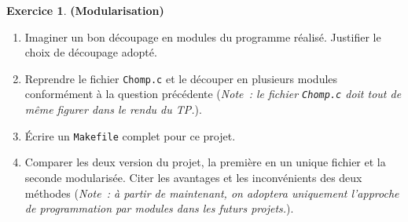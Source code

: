 \documentclass[12pt]{article}
\theoremstyle{definition}
\newtheorem{Exercice}{Exercice}
\begin{document}
\begin{Exercice} {\bf (Modularisation)}\smallskip
\label{ex:4}

\begin{enumerate}
    \item Imaginer un bon découpage en modules du programme réalisé. 
    Justifier le choix de découpage adopté.
    \smallskip
    
    \item Reprendre le fichier {\tt Chomp.c} et le découper en plusieurs
    modules conformément à la question précédente ({\it Note~: le fichier 
    {\tt Chomp.c} doit tout de même figurer dans le rendu du TP.}).
    \smallskip
    
    \item Écrire un {\tt Makefile} complet pour ce projet.
    \smallskip
    
    \item Comparer les deux version du projet, la première en un unique 
    fichier et la seconde modularisée. Citer les avantages et les 
    inconvénients des deux méthodes ({\it Note~: à partir de maintenant, 
    on adoptera uniquement l'approche de programmation par modules dans 
    les futurs projets.}).
\end{enumerate}
\end{Exercice}
\bigskip
\end{document}
